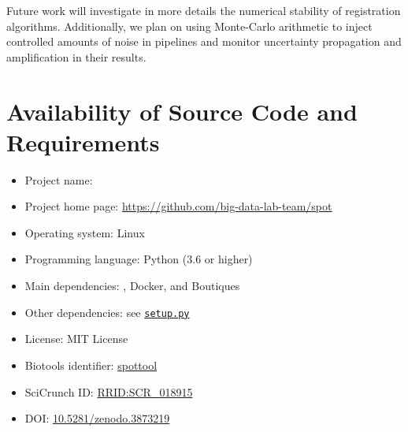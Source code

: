 Future work will investigate in more details the numerical stability of
registration algorithms. Additionally, we plan on using Monte-Carlo arithmetic
to inject controlled amounts of noise in pipelines and monitor
uncertainty propagation and amplification in their results.

\section{Availability of Source Code and Requirements}
\begin{itemize}
  \item Project name: \toolname
  \item Project home page: \url{https://github.com/big-data-lab-team/spot}
  \item Operating system: Linux
  \item Programming language: Python (3.6 or higher)
  \item Main dependencies: \reprozip, Docker, and Boutiques
  \item Other dependencies: see \href{https://github.com/big-data-lab-team/spot}{\texttt{setup.py}}
  \item License: MIT License
  \item Biotools identifier: \href{https://bio.tools/spottool}{spottool}
  \item SciCrunch ID: \href{https://scicrunch.org/scicrunch/Resources/record/nlx_144509-1/SCR_018915/resolver}{RRID:SCR\_018915}
  \item DOI: \href{https://doi.org/10.5281/zenodo.3873219}{10.5281/zenodo.3873219}


\end{itemize}

